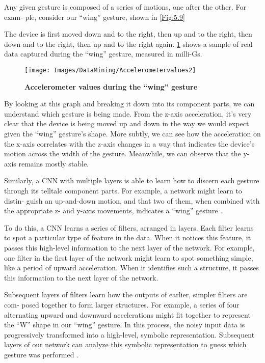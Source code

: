 Any given gesture is composed of a series of motions, one after the other. For exam‐ ple, consider our “wing” gesture, shown in \ref{Fig:5.9}

The device is first moved down and to the right, then up and to the right, then down and to the right, then up and to the right again. \ref{Fig:5.8} shows a sample of real data captured during the “wing” gesture, measured in milli-Gs.

\begin{figure}[h!]
	
	\centering
	\texttt{[image: Images/DataMining/Accelerometervalues2]}
	\caption{\textbf{Accelerometer values during the “wing” gesture} \cite{War:2020}}
	\label{Fig:5.8}
\end{figure}

By looking at this graph and breaking it down into its component parts, we can understand which gesture is being made. From the z-axis acceleration, it’s very clear that the device is being moved up and down in the way we would expect given the “wing” gesture’s shape. More subtly, we can see how the acceleration on the x-axis correlates with the z-axis changes in a way that indicates the device’s motion across the width of the gesture. Meanwhile, we can observe that the y-axis remains mostly stable.

Similarly, a CNN with multiple layers is able to learn how to discern each gesture through its telltale component parts. For example, a network might learn to distin‐ guish an up-and-down motion, and that two of them, when combined with the appropriate z- and y-axis movements, indicates a “wing” gesture \cite{War:2020}.

To do this, a CNN learns a series of filters, arranged in layers. Each filter learns to spot a particular type of feature in the data. When it notices this feature, it passes this high-level information to the next layer of the network. For example, one filter in the first layer of the network might learn to spot something simple, like a period of upward acceleration. When it identifies such a structure, it passes this information to the next layer of the network.

Subsequent layers of filters learn how the outputs of earlier, simpler filters are com‐ posed together to form larger structures. For example, a series of four alternating upward and downward accelerations might fit together to represent the “W” shape in our “wing” gesture.
In this process, the noisy input data is progressively transformed into a high-level, symbolic representation. Subsequent layers of our network can analyze this symbolic representation to guess which gesture was performed \cite{War:2020}.

